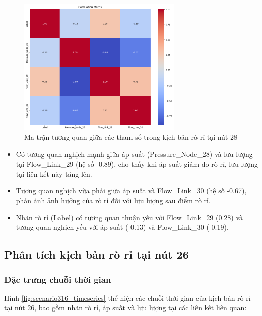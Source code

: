 \begin{figure}[H]
    \centering
    \includegraphics[width=0.7\textwidth]{image/section5_1/scenario_28_corr.png}
    \caption{Ma trận tương quan giữa các tham số trong kịch bản rò rỉ tại nút 28}
    \label{fig:scenario28_corr}
\end{figure}

\begin{itemize}
    \item Có tương quan nghịch mạnh giữa áp suất (Pressure\_Node\_28) và lưu lượng tại Flow\_Link\_29 (hệ số -0.89), cho thấy khi áp suất giảm do rò rỉ, lưu lượng tại liên kết này tăng lên.
    \item Tương quan nghịch vừa phải giữa áp suất và Flow\_Link\_30 (hệ số -0.67), phản ánh ảnh hưởng của rò rỉ đối với lưu lượng sau điểm rò rỉ.
    \item Nhãn rò rỉ (Label) có tương quan thuận yếu với Flow\_Link\_29 (0.28) và tương quan nghịch yếu với áp suất (-0.13) và Flow\_Link\_30 (-0.19).
\end{itemize}

\subsection{Phân tích kịch bản rò rỉ tại nút 26}

\subsubsection{Đặc trưng chuỗi thời gian}

Hình \ref{fig:scenario316_timeseries} thể hiện các chuỗi thời gian của kịch bản rò rỉ tại nút 26, bao gồm nhãn rò rỉ, áp suất và lưu lượng tại các liên kết liên quan:

